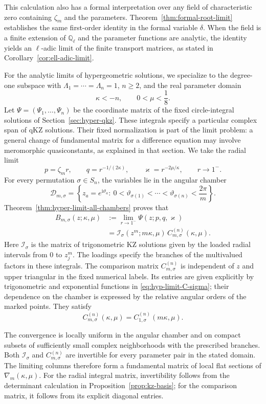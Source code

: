 \documentclass[12pt]{amsart}
\theoremstyle{definition}
\numberwithin{equation}{section}
\theoremstyle{definition}
\let\mc\mathcal
\let\ka\kappa
\let\La\Lambda
\let\si\sigma
\let\ge\geqslant
\begin{document}
This calculation also has a formal interpretation over any
field of characteristic zero containing $\zeta_m$ and the
parameters. Theorem~\ref{thm:formal-root-limit} establishes the
same first-order identity in the formal variable $\delta$.
When the field is a finite extension of $\mathbb Q_\ell$ and
the parameter functions are analytic, the identity yields an
$\ell$-adic limit of the finite transport matrices, as stated in
Corollary~\ref{cor:ell-adic-limit}.

For the analytic limits of hypergeometric solutions, we
specialize to the degree-one subspace with
$\La_1=\cdots=\La_n=1$, $n\ge2$, and the real parameter domain
\[
 \ka<-n,\qquad 0<\mu<\frac18.
\]
Let $\Psi=(\Psi_1,\ldots,\Psi_n)$ be the coordinate matrix of
the fixed circle-integral solutions of
Section~\ref{sec:hyper-qkz}. These integrals specify a particular
complex span of qKZ solutions. Their fixed
normalization is part of the limit problem: a general change of
fundamental matrix for a difference equation may involve
meromorphic quasiconstants, as explained in that section.
We take the radial limit
\[
 p=\zeta_m r,\qquad q=r^{-1/(2\ka)},\qquad
 \varkappa=r^{-2\mu/\ka},\qquad r\longrightarrow1^-.
\]
For every permutation $\si\in S_n$, the variables lie in the
angular chamber
\[
 \mc D_{m,\si}=\left\{z_a=e^{\mathrm{i}\vartheta_a}:\
 0<\vartheta_{\si(1)}<\cdots<\vartheta_{\si(n)}
 <\frac{2\pi}{m}\right\}.
\]
Theorem~\ref{thm:hyper-limit-all-chambers} proves that
\[
 \begin{aligned}
 B_{m,\si}(z;\ka,\mu)
 &:=\lim_{r\to1^-}\Psi(z;p,q,\varkappa)\\
 &=\mc I_\si(z^m;m\ka,\mu)\,
                         C_{m,\si}^{(n)}(\ka,\mu).
 \end{aligned}
\]
Here $\mc I_\si$ is the matrix of trigonometric KZ solutions
given by the loaded radial intervals from $0$ to $z_j^m$.
The loadings specify the branches of the multivalued factors
in these integrals. The comparison matrix
$C_{m,\si}^{(n)}$ is independent of $z$ and upper triangular
in the fixed numerical labels. Its entries are given explicitly
by trigonometric and exponential functions in
\eqref{eq:hyp-limit-C-sigma}; their dependence on the chamber
is expressed by the relative angular orders of the marked points.
They satisfy
\[
 C_{m,\si}^{(n)}(\ka,\mu)
 =C_{1,\si}^{(n)}(m\ka,\mu).
\]

The convergence is locally uniform in the angular chamber and
on compact subsets of sufficiently small complex neighborhoods
with the prescribed branches. Both $\mc I_\si$ and
$C_{m,\si}^{(n)}$ are invertible for every parameter pair in
the stated domain. The limiting columns therefore form a
fundamental matrix of local flat sections of
$\nabla_m(\ka,\mu)$. For the radial integral matrix,
invertibility follows from the determinant calculation in
Proposition~\ref{prop:kz-basis}; for the comparison matrix,
it follows from its explicit diagonal entries.
\end{document}
